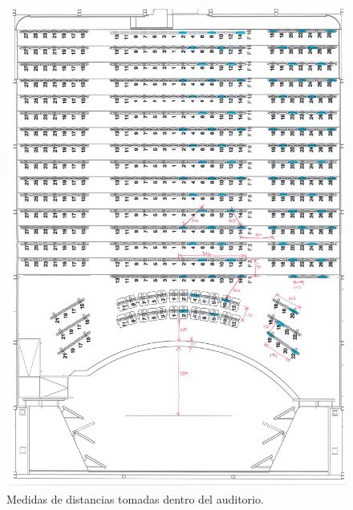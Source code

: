 \documentclass[11pt,a4paper,twoside]{book}
\begin{document}
        \begin{figure}
                \includegraphics[scale=0.5]{../imagenes/AuditorioMedidasButacas.pdf}
                \centering
                \caption{Medidas de distancias tomadas dentro del auditorio.}
                \label{fig:distancias}
            \end{figure}
        
    
\end{document}
